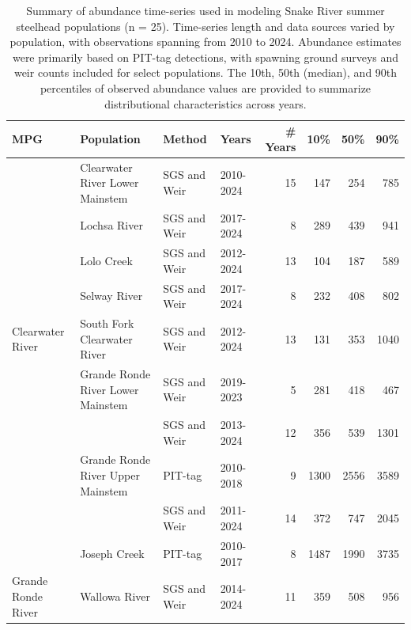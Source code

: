 \documentclass[10pt,a4paper]{article}
\begin{document}
\begin{table}
\centering
\caption{Summary of abundance time-series used in modeling Snake River summer steelhead populations (n = 25). Time-series length and data sources varied by population, with observations spanning from 2010 to 2024. Abundance estimates were primarily based on PIT-tag detections, with spawning ground surveys and weir counts included for select populations. The 10th, 50th (median), and 90th percentiles of observed abundance values are provided to summarize distributional characteristics across years.}
\centering
\fontsize{8}{10}\selectfont
\begin{tabular}[t]{llllrrrr}
\toprule
MPG & Population & Method & Years & \# Years & 10\% & 50\% & 90\%\\
\midrule
 & Clearwater River Lower Mainstem & SGS and Weir & 2010-2024 & 15 & 147 & 254 & 785\\

 & Lochsa River & SGS and Weir & 2017-2024 & 8 & 289 & 439 & 941\\

 & Lolo Creek & SGS and Weir & 2012-2024 & 13 & 104 & 187 & 589\\

 & Selway River & SGS and Weir & 2017-2024 & 8 & 232 & 408 & 802\\

\multirow[t]{-5}{*}[4\dimexpr\aboverulesep+\belowrulesep+\cmidrulewidth]{\raggedright\arraybackslash Clearwater River} & South Fork Clearwater River & SGS and Weir & 2012-2024 & 13 & 131 & 353 & 1040\\

 & Grande Ronde River Lower Mainstem & SGS and Weir & 2019-2023 & 5 & 281 & 418 & 467\\

 &  & SGS and Weir & 2013-2024 & 12 & 356 & 539 & 1301\\

 & \multirow[t]{-2}{*}{\raggedright\arraybackslash Grande Ronde River Upper Mainstem} & PIT-tag & 2010-2018 & 9 & 1300 & 2556 & 3589\\

 &  & SGS and Weir & 2011-2024 & 14 & 372 & 747 & 2045\\

 & \multirow[t]{-2}{*}{\raggedright\arraybackslash Joseph Creek} & PIT-tag & 2010-2017 & 8 & 1487 & 1990 & 3735\\

\multirow[t]{-6}{*}[3\dimexpr\aboverulesep+\belowrulesep+\cmidrulewidth]{\raggedright\arraybackslash Grande Ronde River} & Wallowa River & SGS and Weir & 2014-2024 & 11 & 359 & 508 & 956\\


\end{tabular}
\end{table}
\end{document}
